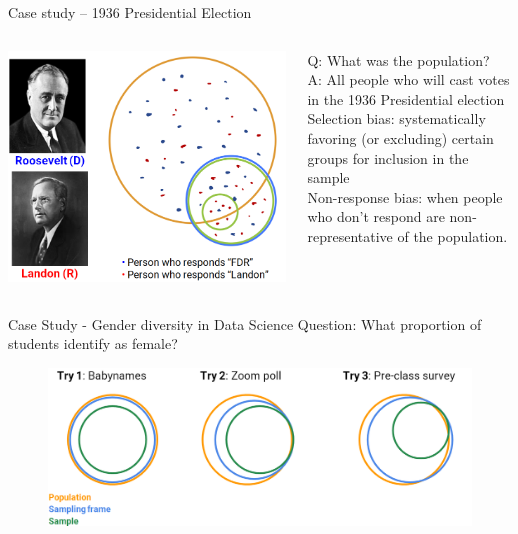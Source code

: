 \documentclass[aspectratio=169]{../latex_main/tntbeamer}  %
\begin{document}
	\begin{frame}{Case study – 1936 Presidential Election}
	    \begin{columns}
	        \begin{column}{.6\textwidth}

	               \includegraphics[scale=.33]{Bild7}

	        \end{column}
	        
	        \begin{column}{.4\textwidth}
	            Q: What was the population?\\
	            A: All people who will cast votes in the 1936 Presidential election\\
	            \bigskip
	            Selection bias: systematically favoring (or excluding) certain groups for inclusion in the sample\\
	            \bigskip
	            Non-response bias: when people who don’t respond are non-representative of the population.

	        \end{column}
	        
	    \end{columns}
	    
	\end{frame}
	
	
	\begin{frame}{Case Study - Gender diversity in Data Science}
	   Question: What proportion of students identify as female?
	   \begin{figure}
	       \centering
	       \includegraphics[scale=.4]{Bild9}
	   \end{figure}
	    
	\end{frame}
\end{document}
